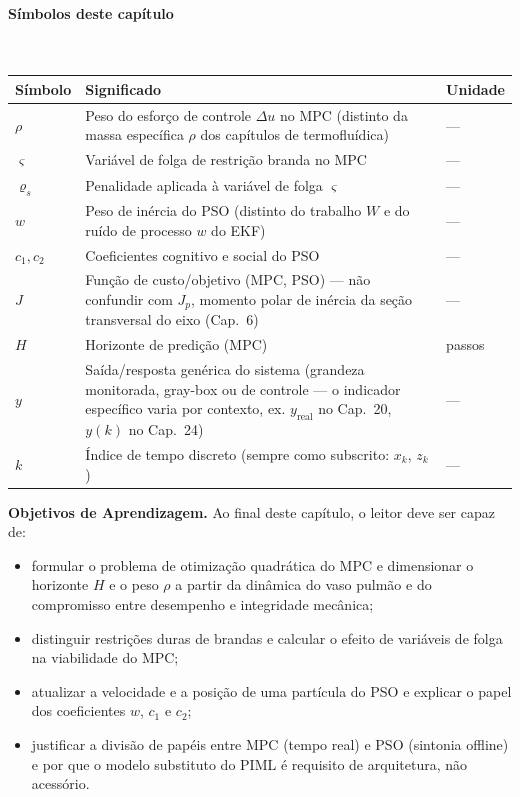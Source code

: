\documentclass[12pt,a4paper]{article}
\numberwithin{equation}{section}
\numberwithin{table}{section}
\numberwithin{figure}{section}
\begin{document}
\paragraph{Símbolos deste capítulo}\mbox{}\\[-0.5em]
{\small
\begin{longtable}{>{\raggedright\arraybackslash}p{2.6cm} >{\raggedright\arraybackslash}p{9.2cm} >{\raggedright\arraybackslash}p{2.6cm}}
	\toprule
	\textbf{Símbolo} & \textbf{Significado} & \textbf{Unidade} \\ \midrule
	\endhead
	$\rho$\dag & Peso do esforço de controle $\Delta u$ no MPC (distinto da massa específica $\rho$ dos capítulos de termofluídica) & --- \\
	$\varsigma$ & Variável de folga de restrição branda no MPC & --- \\
	$\varrho_s$ & Penalidade aplicada à variável de folga $\varsigma$ & --- \\
	$w$\dag & Peso de inércia do PSO (distinto do trabalho $W$ e do ruído de processo $w$ do EKF) & --- \\
	$c_1, c_2$ & Coeficientes cognitivo e social do PSO & --- \\
	$J$ & Função de custo/objetivo (MPC, PSO) — não confundir com $J_p$, momento polar de inércia da seção transversal do eixo (Cap.~6) & --- \\
	$H$ & Horizonte de predição (MPC) & passos \\
	$y$ & Saída/resposta genérica do sistema (grandeza monitorada, gray-box ou de controle — o indicador específico varia por contexto, ex. $y_{\text{real}}$ no Cap.~20, $y(k)$ no Cap.~24) & --- \\
	$k$ & Índice de tempo discreto (sempre como subscrito: $x_k$, $z_k$) & --- \\
	\bottomrule
\end{longtable}
}

	\textbf{Objetivos de Aprendizagem.} Ao final deste capítulo, o leitor
	deve ser capaz de:
	\begin{itemize}
		\item formular o problema de otimização quadrática do MPC e
		dimensionar o horizonte $H$ e o peso $\rho$ a partir da dinâmica
		do vaso pulmão e do compromisso entre desempenho e integridade
		mecânica;
		\item distinguir restrições duras de brandas e calcular o efeito
		de variáveis de folga na viabilidade do MPC;
		\item atualizar a velocidade e a posição de uma partícula do PSO
		e explicar o papel dos coeficientes $w$, $c_1$ e $c_2$;
		\item justificar a divisão de papéis entre MPC (tempo real) e PSO
		(sintonia offline) e por que o modelo substituto do PIML é
		requisito de arquitetura, não acessório.
	\end{itemize}
\end{document}

